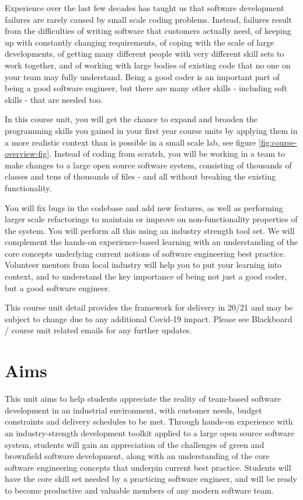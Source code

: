 \documentclass[
]{book}
\begin{document}
Experience over the last few decades has taught us that software development failures are rarely caused by small scale coding problems. Instead, failures result from the difficulties of writing software that customers actually need, of keeping up with constantly changing requirements, of coping with the scale of large developments, of getting many different people with very different skill sets to work together, and of working with large bodies of existing code that no one on your team may fully understand. Being a good coder is an important part of being a good software engineer, but there are many other skills - including soft skills - that are needed too.

In this course unit, you will get the chance to expand and broaden the programming skills you gained in your first year course units by applying them in a more realistic context than is possible in a small scale lab, see figure \ref{fig:course-overview-fig}. Instead of coding from scratch, you will be working in a team to make changes to a large open source software system, consisting of thousands of classes and tens of thousands of files - and all without breaking the existing functionality.

You will fix bugs in the codebase and add new features, as well as performing larger scale refactorings to maintain or improve on non-functionality properties of the system. You will perform all this using an industry strength tool set. We will complement the hands-on experience-based learning with an understanding of the core concepts underlying current notions of software engineering best practice. Volunteer mentors from local industry will help you to put your learning into context, and to understand the key importance of being not just a good coder, but a good software engineer.

This course unit detail provides the framework for delivery in 20/21 and may be subject to change due to any additional Covid-19 impact. Please see Blackboard / course unit related emails for any further updates.

\hypertarget{bilo}{%
\section{Aims}\label{bilo}}

This unit aims to help students appreciate the reality of team-based software development in an industrial environment, with customer needs, budget constraints and delivery schedules to be met. Through hands-on experience with an industry-strength development toolkit applied to a large open source software system, students will gain an appreciation of the challenges of green and brownfield software development, along with an understanding of the core software engineering concepts that underpin current best practice. Students will have the core skill set needed by a practicing software engineer, and will be ready to become productive and valuable members of any modern software team.
\end{document}
